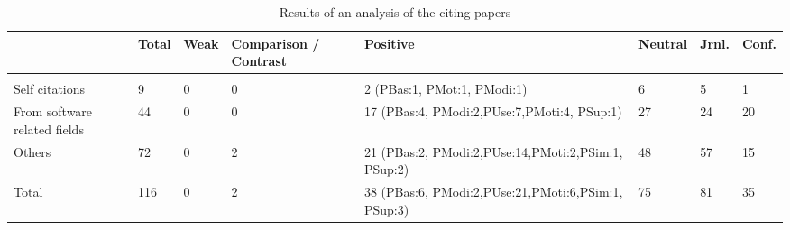 \documentclass[sigplan]{acmart}
\begin{document}
\begin{table*}
	\caption{Results of an analysis of the citing papers}
	\label{tab:CitationAnalysis}
	\begin{tabular}{p{2.5cm}llp{1.5cm}llll}
			\toprule
		& Total & Weak & Comparison / Contrast & Positive                                            & Neutral & Jrnl. & Conf. \\
		\midrule
		&       &      &                       &                                                     &         &         &            \\
		Self citations               & 9     & 0    & 0                     & 2 (PBas:1, PMot:1, PModi:1)                         & 6       & 5       & 1          \\
		From software related fields & 44    & 0    & 0                     & 17 (PBas:4, PModi:2,PUse:7,PMoti:4, PSup:1)         & 27      & 24      & 20         \\
		Others                       & 72    & 0    & 2                     & 21 (PBas:2, PModi:2,PUse:14,PMoti:2,PSim:1, PSup:2) & 48      & 57      & 15         \\
		Total                        & 116   & 0    & 2                     & 38 (PBas:6, PModi:2,PUse:21,PMoti:6,PSim:1, PSup:3) & 75      & 81      & 35        \\ \bottomrule
	\end{tabular}
\end{table*}

%
%		
%		
\end{document}
